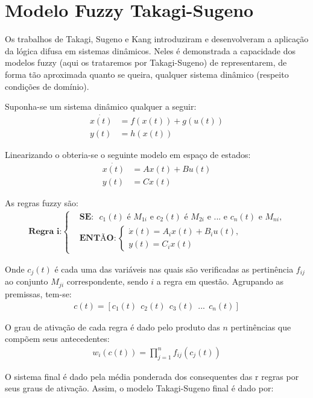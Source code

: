 \section{Modelo Fuzzy Takagi-Sugeno} \label{secTakSug}
Os trabalhos de Takagi, Sugeno \cite{takagiSugeno} e Kang \cite{kang} introduziram e desenvolveram a aplicação da lógica difusa em sistemas dinâmicos. Neles é demonstrada a capacidade dos modelos fuzzy (aqui os trataremos por Takagi-Sugeno) de representarem, de forma tão aproximada quanto se queira, qualquer sistema dinâmico (respeito condições de domínio). 

Suponha-se um sistema dinâmico qualquer a seguir:
\begin{align*}
	\dot{x(t)} &= f(x(t)) + g(u(t)) \\
	y(t) &= h(x(t))
\end{align*}

Linearizando o obteria-se o seguinte modelo em espaço de estados:
\begin{align*}
	\dot{x(t)} &= Ax(t) + Bu(t) \\
	y(t) &= Cx(t)
\end{align*}

As regras fuzzy são:
\begin{align} \label{eqRegraIGeral}
	\textbf{Regra i:}
	\begin{cases}
		&\textbf{SE:} \text{ $c_1(t)$ é $M_{1i}$ e $c_2(t)$ é $M_{2i}$ e ... e $c_n(t)$ e $M_{ni}$,} \\
		&\textbf{ENTÃO}:
		\begin{cases}
			 \dot{x}(t) = A_i  x(t) + B_i  u(t),\\
			y(t) = C_ix(t)
		\end{cases}
	\end{cases}
\end{align}

Onde $c_j(t)$ é cada uma das variáveis nas quais são verificadas as pertinência $f_{ij}$ ao conjunto $M_{ji}$ correspondente, sendo $i$ a regra em questão.  Agrupando as premissas, tem-se:
\begin{align}
	c(t) = [c_1(t) \ \ c_2(t) \ \ c_3(t) \ \ ... \ \ c_n(t)]
\end{align}
	
O grau de ativação de cada regra é dado pelo produto das $n$ pertinências que compõem seus antecedentes:  
\begin{align}
	w_i(c(t)) = \prod_{j=1}^{n} f_{ij}(c_j(t))
\end{align}

O sistema final é dado pela média ponderada dos consequentes das r regras por seus graus de ativação. Assim, o modelo Takagi-Sugeno final é dado por:

